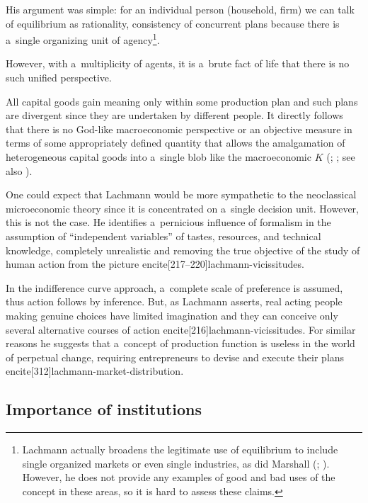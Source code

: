 {\begin{quote}
\end{quote}

His argument was simple: for an individual person (household, firm) we can talk of equilibrium as rationality, consistency of concurrent plans because there is a~single organizing unit of agency\footnote{Lachmann actually broadens the legitimate use of equilibrium to include single organized markets or even single industries, as did Marshall (\cite[37]{lachmann-crisis}; \citeyear[149--150]{lachmann-individualism}). However, he does not provide any examples of good and bad uses of the concept in these areas, so it is hard to assess these claims.}.

However, with a~multiplicity of agents, it is a~brute fact of life that there is no such unified perspective.

All capital goods gain meaning only within some production plan and such plans are divergent since they are undertaken by different people. It directly follows that there is no God-like macroeconomic perspective or an objective measure in terms of some appropriately defined quantity that allows the amalgamation of heterogeneous capital goods into a~single blob like the macroeconomic $K$ (\cite[175--177]{lachmann-salvage}; \citeyear[194]{lachmann-hayek}; see also \cite{garzarelli}).



One could expect that Lachmann would be more sympathetic to the neoclassical microeconomic theory since it is concentrated on a~single decision unit. However, this is not the case. He identifies a~pernicious influence of formalism in the assumption of ``independent variables'' of tastes, resources, and technical knowledge, completely unrealistic and removing the true objective of the study of human action from the picture encite[217--220]{lachmann-vicissitudes}.

In the indifference curve approach, a~complete scale of preference is assumed, thus action follows by inference. But, as Lachmann asserts, real acting people making genuine choices have limited imagination and they can conceive only several alternative courses of action encite[216]{lachmann-vicissitudes}. For similar reasons he suggests that a~concept of production function is useless in the world of perpetual change, requiring entrepreneurs to devise and execute their plans encite[312]{lachmann-market-distribution}.



\subsection{Importance of institutions}





}
